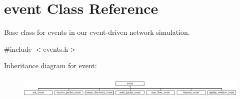 \hypertarget{classevent}{\section{event Class Reference}
\label{classevent}
}


Base class for events in our event-\/driven network simulation.  




{\ttfamily \#include $<$events.\-h$>$}

Inheritance diagram for event\-:\begin{figure}[H]
\begin{center}
\leavevmode
\includegraphics[height=1.032258cm]{classevent}
\end{center}
\end{figure}
